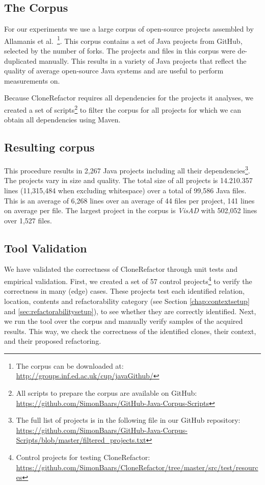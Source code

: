 \documentclass[runningheads]{llncs}
\begin{document}
\subsection{The Corpus}\label{chap:corpus}
For our experiments we use a large corpus of open-source projects assembled by Allamanis et al.~\cite{githubCorpus2013}\footnote{The corpus can be downloaded at: \url{http://groups.inf.ed.ac.uk/cup/javaGithub/}}. This corpus contains a set of Java projects from GitHub, selected by the number of forks. The projects and files in this corpus were de-duplicated manually. This results in a variety of Java projects that reflect the quality of average open-source Java systems and are useful to perform measurements on.

Because CloneRefactor requires all dependencies for the projects it analyses, we created a set of scripts\footnote{All scripts to prepare the corpus are available on GitHub: \url{https://github.com/SimonBaars/GitHub-Java-Corpus-Scripts}} to filter the corpus for all projects for which we can obtain all dependencies using Maven.

\subsection{Resulting corpus}
This procedure results in 2,267 Java projects including all their dependencies\footnote{The full list of projects is in the following file in our GitHub repository: \url{https://github.com/SimonBaars/GitHub-Java-Corpus-Scripts/blob/master/filtered_projects.txt}}. The projects vary in size and quality. The total size of all projects is 14.210.357 lines (11,315,484 when excluding whitespace) over a total of 99,586 Java files. This is an average of 6,268 lines over an average of 44 files per project, 141 lines on average per file. The largest project in the corpus is \textit{VisAD} with 502,052 lines over 1,527 files.

\subsection{Tool Validation}
We have validated the correctness of CloneRefactor through unit tests and empirical validation. First, we created a set of 57 control projects\footnote{Control projects for testing CloneRefactor: \url{https://github.com/SimonBaars/CloneRefactor/tree/master/src/test/resources}} to verify the correctness in many (edge) cases. These projects test each identified relation, location, contents and refactorability category (see Section \ref{chap:contextsetup} and \ref{sec:refactorabilitysetup}), to see whether they are correctly identified. Next, we run the tool over the corpus and manually verify samples of the acquired results. This way, we check the correctness of the identified clones, their context, and their proposed refactoring.
\end{document}
